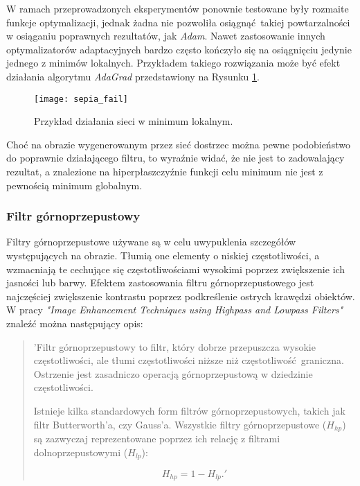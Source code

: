     W ramach przeprowadzonych eksperymentów ponownie testowane były rozmaite funkcje
    optymalizacji, jednak żadna nie pozwoliła osiągnąć takiej powtarzalności w osiąganiu
    poprawnych rezultatów, jak \textit{Adam}. Nawet zastosowanie innych optymalizatorów
    adaptacyjnych bardzo często kończyło się na osiągnięciu jedynie jednego z minimów
    lokalnych. Przykładem takiego rozwiązania może być efekt działania algorytmu
    \textit{AdaGrad} przedstawiony na Rysunku \ref{fig:sepia_fail}.

    \begin{figure}[h!]
      \centering
      \texttt{[image: sepia\_fail]}
      \caption[Przykład działania sieci w minimum lokalnym - źródło: Rysunek własny]{Przykład działania sieci w minimum lokalnym.}
      \label{fig:sepia_fail}
    \end{figure}

    Choć na obrazie wygenerowanym przez sieć dostrzec można pewne podobieństwo do
    poprawnie działającego filtru, to wyraźnie widać, że nie jest to zadowalający
    rezultat, a znalezione na hiperpłaszczyźnie funkcji celu minimum nie jest z pewnością
    minimum globalnym.

  \subsubsection{Filtr górnoprzepustowy}

    Filtry górnoprzepustowe używane są w celu uwypuklenia szczegółów występujących na
    obrazie. Tłumią one elementy o niskiej częstotliwości, a wzmacniają te cechujące
    się częstotliwościami wysokimi poprzez zwiększenie ich jasności lub barwy.
    Efektem zastosowania filtru górnoprzepustowego jest najczęściej zwiększenie
    kontrastu poprzez podkreślenie ostrych krawędzi obiektów. W pracy
    \textit{"Image Enhancement Techniques using Highpass and
    Lowpass Filters"} \cite{highpass_filter} znaleźć można następujący opis:

    \begin{quote}
      'Filtr górnoprzepustowy to filtr, który dobrze przepuszcza wysokie częstotliwości,
      ale tłumi częstotliwości niższe niż częstotliwość graniczna. Ostrzenie jest
      zasadniczo operacją górnoprzepustową w dziedzinie częstotliwości.

      Istnieje kilka standardowych form filtrów górnoprzepustowych, takich jak
      filtr Butterworth'a, czy Gauss'a. Wszystkie filtry górnoprzepustowe ($H_{hp}$) są
      zazwyczaj reprezentowane poprzez ich relację z filtrami dolnoprzepustowymi ($H_{lp}$):

      \begin{equation}
      H_{hp} = 1 - H_{lp}.   '
    \end{equation}
    \end{quote}

